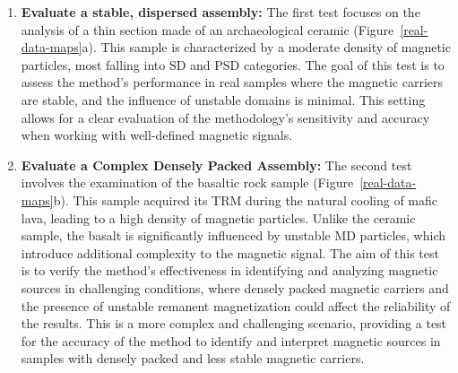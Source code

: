 \begin{enumerate}
\item \textbf{Evaluate a stable, dispersed assembly:} The first test focuses on the analysis of a thin section made of an archaeological ceramic (Figure~\ref{real-data-maps}a). This sample is characterized by a moderate density of magnetic particles, most falling into SD and PSD categories. The goal of this test is to assess the method’s performance in real samples where the magnetic carriers are stable, and the influence of unstable domains is minimal. This setting allows for a clear evaluation of the methodology’s sensitivity and accuracy when working with well-defined magnetic signals.

\item \textbf{Evaluate a Complex Densely Packed Assembly:} The second test involves the examination of the basaltic rock sample (Figure~\ref{real-data-maps}b). This sample acquired its TRM during the natural cooling of mafic lava, leading to a high density of magnetic particles. Unlike the ceramic sample, the basalt is significantly influenced by unstable MD particles, which introduce additional complexity to the magnetic signal. The aim of this test is to verify the method’s effectiveness in identifying and analyzing magnetic sources in challenging conditions, where densely packed magnetic carriers and the presence of unstable remanent magnetization could affect the reliability of the results. This is a more complex and challenging scenario, providing a test for the accuracy of the method to identify and interpret magnetic sources in samples with densely packed and less stable magnetic carriers.
\end{enumerate}

